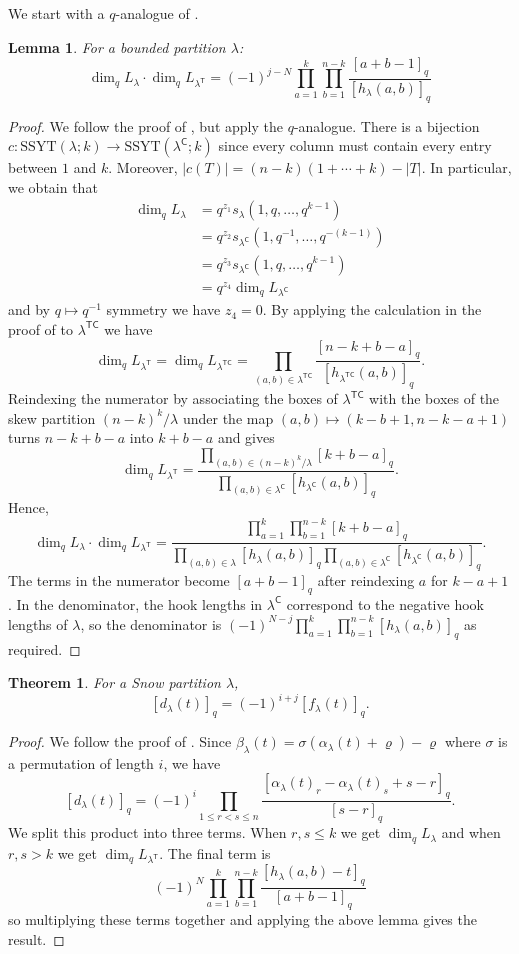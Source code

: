 \documentclass{amsart}
\newcommand\C{\mathsf{C}}
\newcommand\T{\mathsf{T}}
\theoremstyle{plain}
\newtheorem{theorem}{Theorem}[section]
\newtheorem{lemma}[lemma]{Lemma}
\theoremstyle{definition}
\numberwithin{equation}{section}
\begin{document}
We start with a $q$-analogue of .

\begin{lemma}
For a bounded partition $\lambda$:
\[\dim_q L_\lambda\cdot \dim_q L_{\lambda^\T}=(-1)^{j-N}\prod_{a=1}^k\prod_{b=1}^{n-k}\frac{[a+b-1]_q}{[h_\lambda(a,b)]_q}\]
\end{lemma}
\begin{proof}
We follow the proof of \cite[Theorem 1.1]{Gre18}, but apply the $q$-analogue. There is a bijection $c:\mathrm{SSYT}(\lambda;k)\to\mathrm{SSYT}(\lambda^\C;k)$ since every column must contain every entry between $1$ and $k$. Moreover, $|c(T)|=(n-k)(1+\cdots+k)-|T|$. In particular, we obtain that
\begin{align*}
\dim_q L_\lambda&=q^{z_1}s_\lambda(1,q,\dots,q^{k-1})\\
&=q^{z_2}s_{\lambda^\C}(1,q^{-1},\dots,q^{-(k-1)})\\
&=q^{z_3}s_{\lambda^\C}(1,q,\dots,q^{k-1})\\
&=q^{z_4}\dim_q L_{\lambda^\C}
\end{align*}
and by $q\mapsto q^{-1}$ symmetry we have $z_4=0$. By applying the calculation in the proof of  to $\lambda^{\T\C}$ we have
\[\dim_q L_{\lambda^\T}=\dim_q L_{\lambda^{\T\C}}=\prod_{(a,b)\in\lambda^{\T\C}}\frac{[n-k+b-a]_q}{[h_{\lambda^{\T\C}}(a,b)]_q}.\]
Reindexing the numerator by associating the boxes of $\lambda^{\T\C}$ with the boxes of the skew partition $(n-k)^k/\lambda$ under the map $(a,b)\mapsto (k-b+1,n-k-a+1)$ turns $n-k+b-a$ into $k+b-a$ and gives
\[\dim_q L_{\lambda^\T}=\frac{\prod_{(a,b)\in (n-k)^k/\lambda}[k+b-a]_q}{\prod_{(a,b)\in\lambda^\C}[h_{\lambda^\C}(a,b)]_q}.\]
Hence,
\[\dim_q L_\lambda\cdot \dim_q L_{\lambda^\T}=\frac{\prod_{a=1}^k\prod_{b=1}^{n-k}[k+b-a]_q}{\prod_{(a,b)\in\lambda}[h_\lambda(a,b)]_q\prod_{(a,b)\in\lambda^\C}[h_{\lambda^\C}(a,b)]_q}.\]
The terms in the numerator become $[a+b-1]_q$ after reindexing $a$ for $k-a+1$. In the denominator, the hook lengths in $\lambda^\C$ correspond to the negative hook lengths of $\lambda$, so the denominator is $(-1)^{N-j}\prod_{a=1}^k\prod_{b=1}^{n-k}[h_\lambda(a,b)]_q$ as required.
\end{proof}

\begin{theorem}\label{thm:q-dimension-hook}
For a Snow partition $\lambda$,
\[[d_\lambda(t)]_q=(-1)^{i+j}[f_\lambda(t)]_q.\]
\end{theorem}
\begin{proof}
We follow the proof of . Since $\beta_\lambda(t)=\sigma(\alpha_\lambda(t)+\varrho)-\varrho$ where $\sigma$ is a permutation of length $i$, we have
\[[d_\lambda(t)]_q=(-1)^i\prod_{1\leq r<s\leq n}\frac{[\alpha_\lambda(t)_r-\alpha_\lambda(t)_s+s-r]_q}{[s-r]_q}.\]
We split this product into three terms. When $r,s\leq k$ we get $\dim_q L_{\lambda}$ and when $r,s>k$ we get $\dim_q L_{\lambda^\T}$. The final term is
\[(-1)^N\prod_{a=1}^k\prod_{b=1}^{n-k}\frac{[h_\lambda(a,b)-t]_q}{[a+b-1]_q}\]
so multiplying these terms together and applying the above lemma gives the result.
\end{proof}
\end{document}
